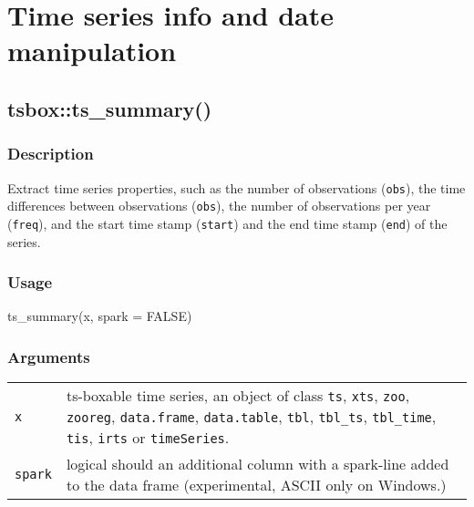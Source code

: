 \documentclass[
  letterpaper,
  DIV=11,
  numbers=noendperiod]{scrreport}
\newenvironment{Shaded}{\begin{snugshade}}{\end{snugshade}}
\newcommand{\AttributeTok}[1]{\textcolor[rgb]{0.40,0.45,0.13}{#1}}
\newcommand{\ConstantTok}[1]{\textcolor[rgb]{0.56,0.35,0.01}{#1}}
\newcommand{\FunctionTok}[1]{\textcolor[rgb]{0.28,0.35,0.67}{#1}}
\newcommand{\NormalTok}[1]{\textcolor[rgb]{0.00,0.23,0.31}{#1}}
\begin{document}
\section{Time series info and date manipulation}\label{sec-tsinfo}

\subsection{tsbox::ts\_summary()}\label{tsboxts_summary}

\subsubsection{Description}\label{description-8}

Extract time series properties, such as the number of observations
(\texttt{obs}), the time differences between observations
(\texttt{obs}), the number of observations per year (\texttt{freq}), and
the start time stamp (\texttt{start}) and the end time stamp
(\texttt{end}) of the series.

\subsubsection{Usage}\label{usage-8}

\begin{Shaded}
\begin{Highlighting}[]
\FunctionTok{ts\_summary}\NormalTok{(x, }\AttributeTok{spark =} \ConstantTok{FALSE}\NormalTok{)}
\end{Highlighting}
\end{Shaded}

\subsubsection{Arguments}\label{arguments-8}

\begin{longtable}[]{@{}ll@{}}
\toprule\noalign{}
\endhead
\bottomrule\noalign{}
\endlastfoot
\texttt{x} & ts-boxable time series, an object of class \texttt{ts},
\texttt{xts}, \texttt{zoo}, \texttt{zooreg}, \texttt{data.frame},
\texttt{data.table}, \texttt{tbl}, \texttt{tbl\_ts}, \texttt{tbl\_time},
\texttt{tis}, \texttt{irts} or \texttt{timeSeries}. \\
\texttt{spark} & logical should an additional column with a spark-line
added to the data frame (experimental, ASCII only on Windows.) \\
\end{longtable}
\end{document}
